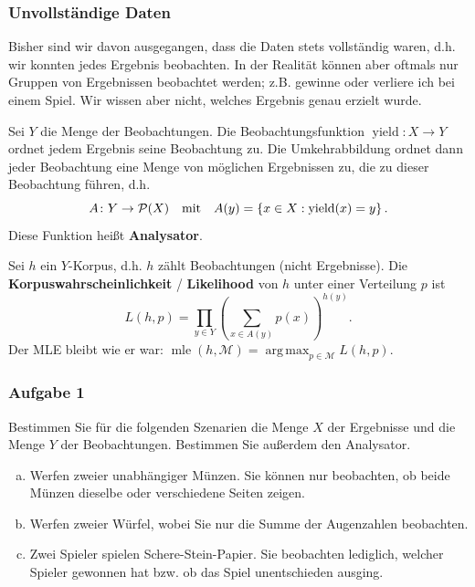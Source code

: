 \documentclass{beamer}
\DeclareMathOperator*{\argmax}{arg\,max}
\begin{document}
\begin{frame} \frametitle{Unvollständige Daten}
	\justifying \footnotesize
	Bisher sind wir davon ausgegangen, dass die Daten stets vollständig waren, d.h. wir konnten jedes Ergebnis beobachten. In der Realität können aber oftmals nur Gruppen von Ergebnissen beobachtet werden; z.B. gewinne oder verliere ich bei einem Spiel. Wir wissen aber nicht, welches Ergebnis genau erzielt wurde. 
	
	Sei $Y$ die Menge der Beobachtungen. Die Beobachtungsfunktion $\operatorname{yield} \colon X \to Y$ ordnet jedem Ergebnis seine Beobachtung zu. Die Umkehrabbildung ordnet dann jeder Beobachtung eine Menge von möglichen Ergebnissen zu, die zu dieser Beobachtung führen, d.h.
	\begin{equation*}
		A \colon Y \to \mathcal{P}(X) \quad \text{mit} \quad A(y) = \left\{ x \in X: \operatorname{yield}(x) = y \right\} .
	\end{equation*}
	Diese Funktion heißt \textbf{Analysator}. 
	\pause
	
	Sei $h$ ein $Y$-Korpus, d.h. $h$ zählt Beobachtungen (nicht Ergebnisse). Die \textbf{Korpuswahrscheinlichkeit} / \textbf{Likelihood} von $h$ unter einer Verteilung $p$ ist 
	\begin{equation*}
		L(h,p) = \prod_{y \in Y} \left( \sum_{x \in A(y)} p(x) \right)^{h(y)}.
	\end{equation*}
	Der MLE bleibt wie er war: $\operatorname{mle}(h,\mathcal{M}) = \argmax_{p \in \mathcal{M}} L(h,p)$.
\end{frame}

\begin{frame} \frametitle{Aufgabe 1}
	\small
	Bestimmen Sie für die folgenden Szenarien die Menge $X$ der Ergebnisse und die Menge $Y$ der
	Beobachtungen. Bestimmen Sie außerdem den Analysator.
	\begin{enumerate}[(a)]
		\item Werfen zweier unabhängiger Münzen. Sie können nur beobachten, ob beide Münzen dieselbe oder verschiedene Seiten zeigen.
		\item Werfen zweier Würfel, wobei Sie nur die Summe der Augenzahlen beobachten.
		\item Zwei Spieler spielen Schere-Stein-Papier. Sie beobachten lediglich, welcher Spieler gewonnen hat bzw. ob das Spiel unentschieden ausging.
	\end{enumerate}
\end{frame}
\end{document}
